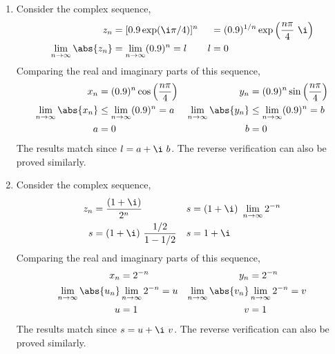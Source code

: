 \begin{enumerate}
    \item Consider the complex sequence,
          \begin{align}
              z_n                           & = [0.9\exp(\i \pi/4)]^{n}               &
                                            & = (0.9)^{1/n} \exp \Big( \frac{n\pi}{4}
              \ \i \Big)                                                                \\
              \lim_{n \to \infty} \abs{z_n} & = \lim_{n \to \infty} (0.9)^n = l       &
              l                             & = 0
          \end{align}
          Comparing the real and imaginary parts of this sequence,
          \begin{align}
              x_n                           & = (0.9)^n \cos\Big( \frac{n\pi}{4}
              \Big)                         &
              y_n                           & = (0.9)^n \sin\Big( \frac{n\pi}{4}
              \Big)                                                                  \\
              \lim_{n \to \infty} \abs{x_n} & \leq \lim_{n \to \infty }(0.9)^n = a &
              \lim_{n \to \infty} \abs{y_n} & \leq \lim_{n \to \infty }(0.9)^n = b   \\
              a                             & = 0                                  &
              b                             & = 0
          \end{align}
          The results match since $ l = a + \i\ b $. The reverse verification can also
          be proved similarly.

    \item Consider the complex sequence,
          \begin{align}
              z_n & = \frac{(1 + \i)}{2^n}                 &
              s   & = (1 + \i)\ \lim_{n \to \infty} 2^{-n}   \\
              s   & = (1 + \i)\ \frac{1/2}{1 - 1/2}        &
              s   & = 1 + \i
          \end{align}
          Comparing the real and imaginary parts of this sequence,
          \begin{align}
              x_n                           & = 2^{-n}                       &
              y_n                           & = 2^{-n}                         \\
              \lim_{n \to \infty} \abs{u_n} & \lim_{n \to \infty} 2^{-n} = u &
              \lim_{n \to \infty} \abs{v_n} & \lim_{n \to \infty} 2^{-n} = v   \\
              u                             & = 1                            &
              v                             & = 1
          \end{align}
          The results match since $ s = u + \i\ v $. The reverse verification can also
          be proved similarly. \par


\end{enumerate}
